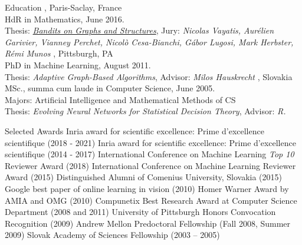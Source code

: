 \documentclass{resume}
\begin{document}
\begin{category}{Education}
, Paris-Saclay, France \\ %
HdR in Mathematics, June 2016.\\
Thesis: \href{http://researchers.lille.inria.fr/~valko/hp/publications/valko2016bandits.pdf}{\emph{Bandits on Graphs and Structures}}, Jury:\/ \emph{Nicolas Vayatis, Aur\' elien Garivier, Vianney Perchet, Nicol\`o Cesa-Bianchi, G\' abor Lugosi,  Mark Herbster, R\' emi Munos}
, Pittsburgh, PA \\ %
PhD in Machine Learning, August 2011.\\
Thesis: \emph{Adaptive Graph-Based Algorithms}, Advisor: \emph{Milos Hauskrecht}
, Slovakia\\%
MSc., summa cum laude in Computer Science, June 2005.\\
Majors: Artificial Intelligence  and Mathematical Methods of CS\\ %
Thesis: \emph{Evolving Neural Networks for Statistical Decision Theory}, Advisor:  \emph{R.\@Harman}
\end{category}
\begin{category}{Selected Awards}
	\citemnobullet Inria award for scientific excellence:
Prime d'excellence scientifique (2018 - 2021)
	\citemnobullet Inria award for scientific excellence:
Prime d'excellence scientifique (2014 - 2017)
\citemnobullet International Conference on Machine Learning \emph{Top 10} Reviewer Award (2018)
\citemnobullet International Conference on Machine Learning Reviewer Award (2015)
\citemnobullet Distinguished Alumni of Comenius University, Slovakia (2015)
\citemnobullet  Google best paper of online learning in vision (2010)
\citemnobullet Homer Warner Award by AMIA and OMG (2010)
	\citemnobullet Compunetix Best Research Award at Computer Science 
Department (2008 and 2011)	
	\citemnobullet University of Pittsburgh Honors Convocation Recognition (2009)
       \citemnobullet Andrew Mellon Predoctoral Fellowship (Fall 2008, Summer 
2009)	
       \citemnobullet Slovak Academy of Sciences Fellowship (2003 -- 2005)

\end{category}
\end{document}
